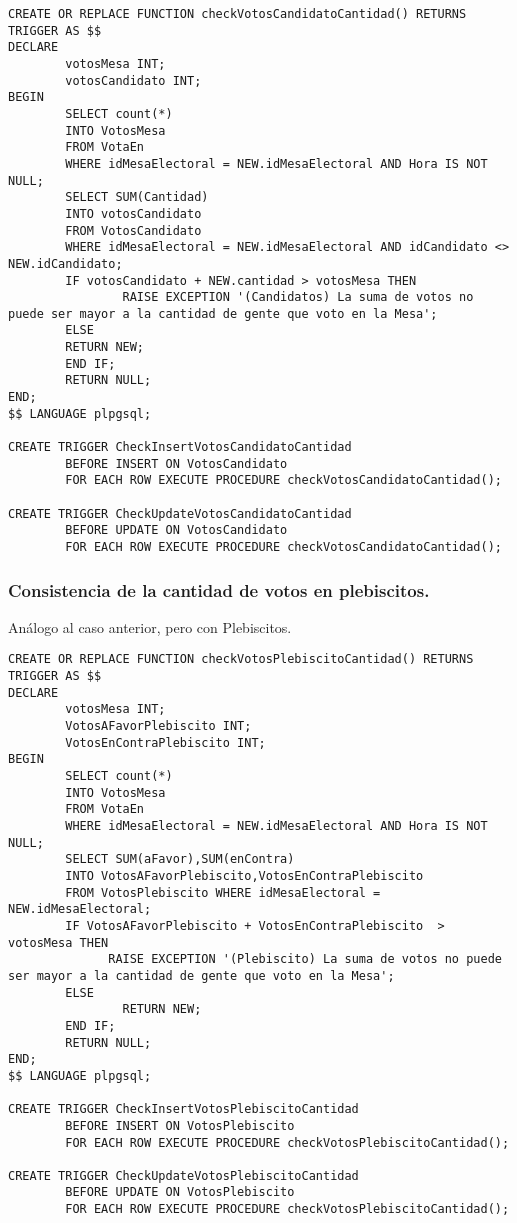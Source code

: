 \begin{verbatim}
CREATE OR REPLACE FUNCTION checkVotosCandidatoCantidad() RETURNS TRIGGER AS $$
DECLARE
        votosMesa INT;
        votosCandidato INT; 
BEGIN
        SELECT count(*)
        INTO VotosMesa 
        FROM VotaEn 
        WHERE idMesaElectoral = NEW.idMesaElectoral AND Hora IS NOT NULL;
        SELECT SUM(Cantidad) 
        INTO votosCandidato 
        FROM VotosCandidato 
        WHERE idMesaElectoral = NEW.idMesaElectoral AND idCandidato <> NEW.idCandidato;
        IF votosCandidato + NEW.cantidad > votosMesa THEN
                RAISE EXCEPTION '(Candidatos) La suma de votos no puede ser mayor a la cantidad de gente que voto en la Mesa';
        ELSE
        RETURN NEW;
        END IF;
        RETURN NULL;
END;
$$ LANGUAGE plpgsql;

CREATE TRIGGER CheckInsertVotosCandidatoCantidad
        BEFORE INSERT ON VotosCandidato
        FOR EACH ROW EXECUTE PROCEDURE checkVotosCandidatoCantidad();

CREATE TRIGGER CheckUpdateVotosCandidatoCantidad
        BEFORE UPDATE ON VotosCandidato
        FOR EACH ROW EXECUTE PROCEDURE checkVotosCandidatoCantidad();

\end{verbatim}

\subsubsection{Consistencia de la cantidad de votos en plebiscitos.}

\indent Análogo al caso anterior, pero con Plebiscitos.\\

\begin{verbatim}
CREATE OR REPLACE FUNCTION checkVotosPlebiscitoCantidad() RETURNS TRIGGER AS $$
DECLARE
        votosMesa INT;
        VotosAFavorPlebiscito INT; 
        VotosEnContraPlebiscito INT;
BEGIN
        SELECT count(*) 
        INTO VotosMesa 
        FROM VotaEn 
        WHERE idMesaElectoral = NEW.idMesaElectoral AND Hora IS NOT NULL;
        SELECT SUM(aFavor),SUM(enContra) 
        INTO VotosAFavorPlebiscito,VotosEnContraPlebiscito 
        FROM VotosPlebiscito WHERE idMesaElectoral = NEW.idMesaElectoral;
        IF VotosAFavorPlebiscito + VotosEnContraPlebiscito  > votosMesa THEN
              RAISE EXCEPTION '(Plebiscito) La suma de votos no puede ser mayor a la cantidad de gente que voto en la Mesa';
        ELSE
                RETURN NEW;
        END IF;
        RETURN NULL;
END;
$$ LANGUAGE plpgsql;

CREATE TRIGGER CheckInsertVotosPlebiscitoCantidad
        BEFORE INSERT ON VotosPlebiscito
        FOR EACH ROW EXECUTE PROCEDURE checkVotosPlebiscitoCantidad();

CREATE TRIGGER CheckUpdateVotosPlebiscitoCantidad
        BEFORE UPDATE ON VotosPlebiscito
        FOR EACH ROW EXECUTE PROCEDURE checkVotosPlebiscitoCantidad();
\end{verbatim}
\newpage

